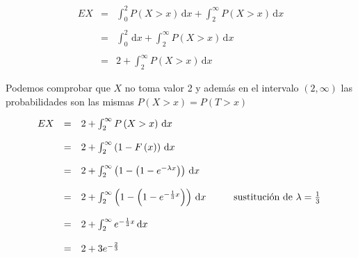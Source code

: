 \documentclass{article}
\begin{document}
\begin{flushleft}
        \begin{equation*}
            \begin{array}{rcl}
                EX  & = &   \int_{0}^{2} P \left(X > x \right) \,\mathrm{d}x + \int_{2}^{\infty} P \left(X >x \right) \,\mathrm{d}x   
                \\\\
                    & = &  \int_{0}^{2}  \,\mathrm{d}x + \int_{2}^{\infty} P \left(X >x \right) \,\mathrm{d}x   
                \\\\
                    & = &  2 + \int_{2}^{\infty} P \left(X >x \right) \,\mathrm{d}x   
            \end{array}
        \end{equation*}

        Podemos comprobar que $X$ no toma valor 2 y adem\'as en el intervalo $\left(2,\infty \right)$ las probabilidades son las mismas 
        $P \left(X>x \right)  = P \left(T>x \right)$ 

        \begin{equation*}
            \begin{array}{rcl}
                EX  & = &   2  + \int_{2}^{\infty} P \left(X >x \right) \,\mathrm{d}x   
                \\\\
                    & = &   2 +  \int_{2}^{\infty} \left(1- F \left(x\right)\right) \,\mathrm{d}x 
                \\\\
                    & = &   2 +  \int_{2}^{\infty} \left(1- \left(1 - e^{- \lambda x }\right)\right) \,\mathrm{d}x   
                \\\\
                    & = &   2 +  \int_{2}^{\infty} \left(1- \left(1 - e^{- \frac{1}{3} x }\right)\right) \,\mathrm{d}x   \hspace*{1.0cm}  \mbox{sustituci\'on de $\lambda = \frac{1}{3}$ }
                \\\\ 
                    & = &   2 +  \int_{2}^{\infty} e^{- \frac{1}{3} x } \,\mathrm{d}x 
                \\\\
                    & = &   2 + 3 e^{-\frac{2}{3}}
            \end{array}
        \end{equation*}

    \end{flushleft}
\end{document}
